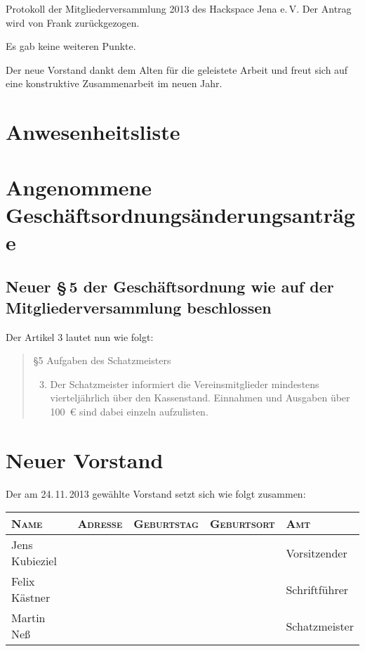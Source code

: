 \documentclass[ngerman]{scrartcl}
\begin{document}
\begin{Protokoll}{Protokoll der Mitgliederversammlung 2013 des Hackspace
    Jena e.\,V.}
Der Antrag wird von Frank zurückgezogen.


Es gab keine weiteren Punkte.

Der neue Vorstand dankt dem Alten für die geleistete Arbeit und freut
sich auf eine konstruktive Zusammenarbeit im neuen Jahr.

\newpage
\appendix

\section{Anwesenheitsliste}
\newpage
\section{Angenommene Geschäftsordnungsänderungsanträge}
\subsection{Neuer §\,5 der Geschäftsordnung wie auf der Mitgliederversammlung beschlossen}
Der Artikel 3 lautet nun wie folgt:

\label{sec:neuer_go_artikel}
\begin{quote}
§5 Aufgaben des Schatzmeisters

\begin{enumerate}
    \setcounter{enumi}{2}
    \item Der Schatzmeister informiert die Vereinsmitglieder
        mindestens vierteljährlich über den
        Kassenstand. Einnahmen und Ausgaben über 100~\euro{} sind dabei
        einzeln aufzulisten.
\end{enumerate}
\end{quote}

\newpage
\section{Neuer Vorstand}

Der am 24.\,11.\,2013 gewählte Vorstand setzt sich wie folgt zusammen:

\label{sec:neuer_vorstand}
\begin{table}[h!]
    \centering
    \begin{tabularx}{\textwidth}{l|X|c|l|l}
        \textsc{Name} & \textsc{Adresse} & \textsc{Geburtstag} & \textsc{Geburtsort} & \textsc{Amt} \\ \hline
        Jens Kubieziel & & & & Vorsitzender \\
        Felix Kästner & & & & Schriftführer \\
        Martin Neß & & & & Schatzmeister
    \end{tabularx}
\end{table}


\end{Protokoll}
\end{document}
